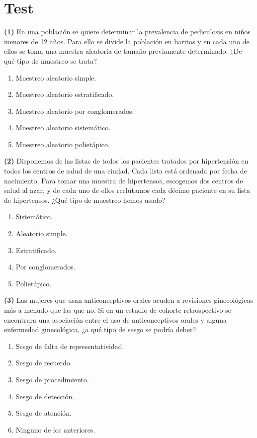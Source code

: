 \documentclass[
]{book}
\providecommand{\tightlist}{%
  \setlength{\itemsep}{0pt}\setlength{\parskip}{0pt}}
\theoremstyle{definition}
\theoremstyle{definition}
\theoremstyle{definition}
\theoremstyle{definition}
\theoremstyle{remark}
\begin{document}
\hypertarget{test-1}{%
\section{Test}\label{test-1}}

\textbf{(1)} En una población se quiere determinar la prevalencia de pediculosis en niños menores de 12 años. Para ello se divide la población en barrios y en cada uno de ellos se toma una muestra aleatoria de tamaño previamente determinado. ¿De qué tipo de muestreo se trata?

\begin{enumerate}
\def\labelenumi{\arabic{enumi}.}
\tightlist
\item
  Muestreo aleatorio simple.
\item
  Muestreo aleatorio estratificado.
\item
  Muestreo aleatorio por conglomerados.
\item
  Muestreo aleatorio sistemático.
\item
  Muestreo aleatorio polietápico.
\end{enumerate}

\textbf{(2)} Disponemos de las listas de todos los pacientes tratados por hipertensión en todos los centros de salud de una ciudad. Cada lista está ordenada por fecha de nacimiento. Para tomar una muestra de hipertensos, escogemos dos centros de salud al azar, y de cada uno de ellos reclutamos cada décimo paciente en su lista de hipertensos. ¿Qué tipo de muestreo hemos usado?

\begin{enumerate}
\def\labelenumi{\arabic{enumi}.}
\tightlist
\item
  Sistemático.
\item
  Aleatorio simple.
\item
  Estratificado.
\item
  Por conglomerados.
\item
  Polietápico.
\end{enumerate}

\textbf{(3)} Las mujeres que usan anticonceptivos orales acuden a revisiones ginecológicas más a menudo que las que no. Si en un estudio de cohorte retrospectivo se encontrara una asociación entre el uso de anticonceptivos orales y alguna enfermedad ginecológica, ¿a qué tipo de sesgo se podría deber?

\begin{enumerate}
\def\labelenumi{\arabic{enumi}.}
\tightlist
\item
  Sesgo de falta de representatividad.
\item
  Sesgo de recuerdo.
\item
  Sesgo de procedimiento.
\item
  Sesgo de detección.
\item
  Sesgo de atención.
\item
  Ninguno de los anteriores.
\end{enumerate}
\end{document}
